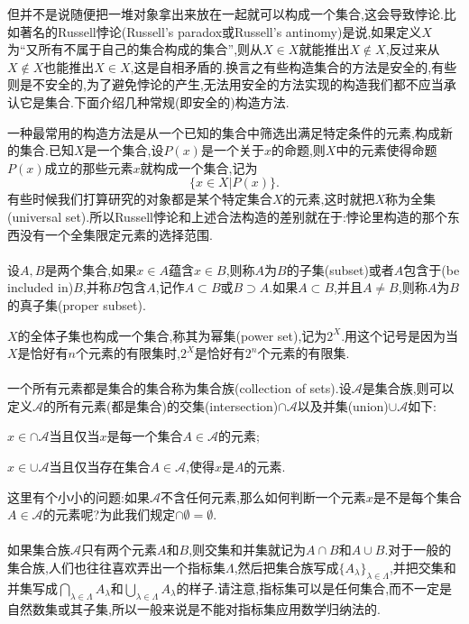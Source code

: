 但并不是说随便把一堆对象拿出来放在一起就可以构成一个集合,这会导致悖论.比如著名的Russell悖论(Russell's paradox或Russell's antinomy)是说,如果定义$X$为“又所有不属于自己的集合构成的集合”,则从$X\in X$就能推出$X\notin X$,反过来从$X\notin X$也能推出$X\in X$,这是自相矛盾的.换言之有些构造集合的方法是安全的,有些则是不安全的,为了避免悖论的产生,无法用安全的方法实现的构造我们都不应当承认它是集合.下面介绍几种常规(即安全的)构造方法.

一种最常用的构造方法是从一个已知的集合中筛选出满足特定条件的元素,构成新的集合.已知$X$是一个集合,设$P(x)$是一个关于$x$的命题,则$X$中的元素使得命题$P(x)$成立的那些元素$x$就构成一个集合,记为\begin{equation}
\{x\in X|P(x) \}.
\end{equation}
有些时候我们打算研究的对象都是某个特定集合$X$的元素,这时就把$X$称为全集(universal set).所以Russell悖论和上述合法构造的差别就在于:悖论里构造的那个东西没有一个全集限定元素的选择范围.
\\ \hspace*{\fill} \\%
设$A,B$是两个集合,如果$x\in A$蕴含$x\in B$,则称$A$为$B$的子集(subset)或者$A$包含于(be included in)$B$,并称$B$包含$A$,记作$A\subset B$或$B\supset A$.如果$A\subset B$,并且$A\neq B$,则称$A$为$B$的真子集(proper subset).

$X$的全体子集也构成一个集合,称其为幂集(power set),记为$2^X$.用这个记号是因为当$X$是恰好有$n$个元素的有限集时,$2^X$是恰好有$2^n$个元素的有限集.
\\ \hspace*{\fill} \\%
一个所有元素都是集合的集合称为集合族(collection of sets).设$\mathcal{A}$是集合族,则可以定义$\mathcal{A}$的所有元素(都是集合)的交集(intersection)$\cap\mathcal{A}$以及并集(union)$\cup\mathcal{A}$如下:
\begin{blist}
	\item $x\in\cap\mathcal{A}$当且仅当$x$是每一个集合$A\in\mathcal{A}$的元素;
	\item $x\in\cup\mathcal{A}$当且仅当存在集合$A\in\mathcal{A}$,使得$x$是$A$的元素.
\end{blist}

这里有个小小的问题:如果$\mathcal{A}$不含任何元素,那么如何判断一个元素$x$是不是每个集合$A\in\mathcal{A}$的元素呢?为此我们规定$\cap\emptyset = \emptyset$.
\\ \hspace*{\fill} \\%
如果集合族$\mathcal{A}$只有两个元素$A$和$B$,则交集和并集就记为$A\cap B$和$A\cup B$.对于一般的集合族,人们也往往喜欢弄出一个指标集$\Lambda$,然后把集合族写成$\{A_{\lambda}\}_{\lambda\in\Lambda}$,并把交集和并集写成$\bigcap_{\lambda\in\Lambda}A_{\lambda}$和$\bigcup_{\lambda\in\Lambda}A_{\lambda}$的样子.请注意,指标集可以是任何集合,而不一定是自然数集或其子集,所以一般来说是不能对指标集应用数学归纳法的.

